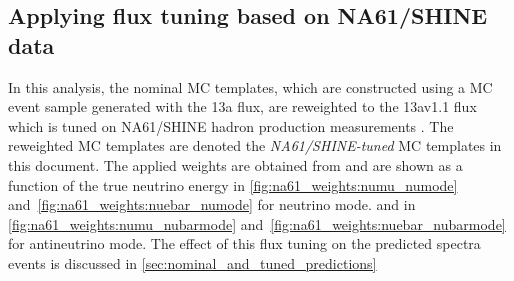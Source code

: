 \subsection {Applying flux tuning based on NA61/SHINE data}
\label{sec:na61_weights}

In this analysis, the nominal MC templates, which are constructed using a MC event sample generated with the 13a flux,
are reweighted to the 13av1.1 flux which is tuned on NA61/SHINE hadron production measurements \cite{FluxTuning13a}\cite{NA61/SHINET2K2014}.
The reweighted MC templates are denoted the {\em NA61/SHINE-tuned} MC templates in this document.
The applied weights are obtained from \cite{FluxTuning13a} and are shown as a function of the true neutrino energy 
in \cref{fig:na61_weights:numu_numode} and~\ref{fig:na61_weights:nuebar_numode} for neutrino mode.
and
in \cref{fig:na61_weights:numu_nubarmode} and~\ref{fig:na61_weights:nuebar_nubarmode} for antineutrino mode.
The effect of this flux tuning on the predicted spectra events is discussed in \cref{sec:nominal_and_tuned_predictions} 

